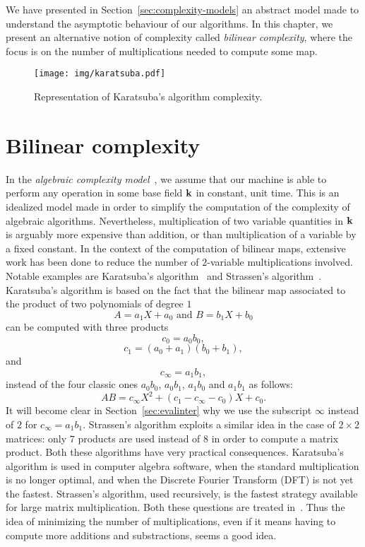 We have presented in Section~\ref{sec:complexity-models} an abstract model made
to understand the asymptotic behaviour of our algorithms. In this chapter, we
present an alternative notion of complexity called \emph{bilinear complexity},
where the focus is on the number of multiplications needed to compute some map.
\minitoc

\begin{figure}[h]
  \centering
  \texttt{[image: img/karatsuba.pdf]}
  \caption{Representation of Karatsuba's algorithm complexity.}
  \label{fig:karatsuba}
\end{figure}
\clearpage

\section{Bilinear complexity}

In the \emph{algebraic complexity model}~\cite{BCS13}, we assume that our
machine is able to perform any operation in some base field $\mathbf{k}$ in constant,
unit time. This is an idealized model made in order to simplify the
computation of the complexity of algebraic algorithms. Nevertheless,
multiplication of two variable quantities in $\mathbf{k}$ is arguably more expensive
than addition, or than multiplication of a variable by a fixed constant. In the
context of the computation of bilinear maps, extensive work has been done to
reduce the number of $2$-variable multiplications involved. Notable examples are
Karatsuba's algorithm~\cite{Karatsuba63} and
Strassen's algorithm~\cite{Strassen69}. Karatsuba's algorithm is
based on the fact that the bilinear map associated to the product of two
polynomials of degree $1$
\[
  A = a_1 X + a_0\text{ and }B = b_1 X + b_0
\]
can be computed with three products
\[
  c_0 = a_0b_0,
\]
\[
  c_1 = (a_0+a_1)(b_0+b_1),
\]
and
\[
  c_\infty = a_1b_1,
\]
instead
of the four classic ones $a_0b_0$, $a_0b_1$, $a_1b_0$ and $a_1b_1$ as follows:
\[
  AB = c_\infty X^2 + (c_1-c_\infty-c_0) X + c_0.
\]
It will become clear in Section~\ref{sec:evalinter} why we use the subscript
$\infty$ instead of $2$ for $c_\infty = a_1b_1$. Strassen's algorithm
exploits a similar idea in the case of $2\times2$ matrices: only $7$ products
are used instead of $8$ in order to compute a matrix product. Both these
algorithms have very practical consequences. Karatsuba's algorithm is used in
computer algebra software, when the standard multiplication is no longer
optimal, and when the Discrete Fourier Transform (DFT) is not yet the fastest.
Strassen's algorithm, used recursively, is the fastest strategy available for
large matrix multiplication. Both these questions are treated in~\cite{GG13}.
Thus the idea of minimizing the number of multiplications, even if it means
having to compute more additions and substractions, seems a good idea.

